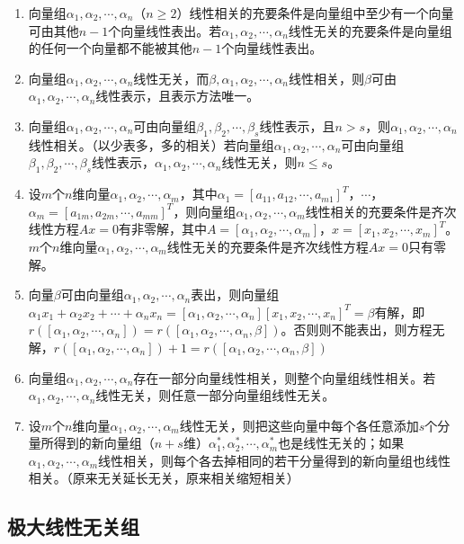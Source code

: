 \documentclass[UTF8, 12pt]{ctexart}
\begin{document}
\begin{enumerate}
\item 向量组$\alpha_1,\alpha_2,\cdots,\alpha_n$（$n\geqslant2$）线性相关的充要条件是向量组中至少有一个向量可由其他$n-1$个向量线性表出。若$\alpha_1,\alpha_2,\cdots,\alpha_n$线性无关的充要条件是向量组的任何一个向量都不能被其他$n-1$个向量线性表出。
\item 向量组$\alpha_1,\alpha_2,\cdots,\alpha_n$线性无关，而$\beta,\alpha_1,\alpha_2,\cdots,\alpha_n$线性相关，则$\beta$可由$\alpha_1,\alpha_2,\cdots,\alpha_n$线性表示，且表示方法唯一。
\item 向量组$\alpha_1,\alpha_2,\cdots,\alpha_n$可由向量组$\beta_1,\beta_2,\cdots,\beta_s$线性表示，且$n>s$，则$\alpha_1,\alpha_2,\cdots,\alpha_n$线性相关。（以少表多，多的相关）若向量组$\alpha_1,\alpha_2,\cdots,\alpha_n$可由向量组$\beta_1,\beta_2,\cdots,\beta_s$线性表示，$\alpha_1,\alpha_2,\cdots,\alpha_n$线性无关，则$n\leqslant s$。
\item 设$m$个$n$维向量$\alpha_1,\alpha_2,\cdots,\alpha_m$，其中$\alpha_1=[a_{11},a_{12},\cdots,a_{m1}]^T$，$\cdots$，$\alpha_m=[a_{1m},a_{2m},\cdots,a_{mm}]^T$，则向量组$\alpha_1,\alpha_2,\cdots,\alpha_m$线性相关的充要条件是齐次线性方程$Ax=0$有非零解，其中$A=[\alpha_1,\alpha_2,\cdots,\alpha_m]$，$x=[x_1,x_2,\cdots,x_m]^T$。$m$个$n$维向量$\alpha_1,\alpha_2,\cdots,\alpha_m$线性无关的充要条件是齐次线性方程$Ax=0$只有零解。
\item 向量$\beta$可由向量组$\alpha_1,\alpha_2,\cdots,\alpha_n$表出，则向量组$\alpha_1x_1+\alpha_2x_2+\cdots+\alpha_nx_n=[\alpha_1,\alpha_2,\cdots,\alpha_n][x_1,x_2,\cdots,x_n]^T=\beta$有解，即$r([\alpha_1,\alpha_2,\cdots,\alpha_n])=r([\alpha_1,\alpha_2,\cdots,\alpha_n,\beta])$。否则则不能表出，则方程无解，$r([\alpha_1,\alpha_2,\cdots,\alpha_n])+1=r([\alpha_1,\alpha_2,\cdots,\alpha_n,\beta])$
\item 向量组$\alpha_1,\alpha_2,\cdots,\alpha_n$存在一部分向量线性相关，则整个向量组线性相关。若$\alpha_1,\alpha_2,\cdots,\alpha_n$线性无关，则任意一部分向量组线性无关。
\item 设$m$个$n$维向量$\alpha_1,\alpha_2,\cdots,\alpha_m$线性无关，则把这些向量中每个各任意添加$s$个分量所得到的新向量组（$n+s$维）$\alpha_1^*,\alpha_2^*,\cdots,\alpha_m^*$也是线性无关的；如果$\alpha_1,\alpha_2,\cdots,\alpha_m$线性相关，则每个各去掉相同的若干分量得到的新向量组也线性相关。（原来无关延长无关，原来相关缩短相关）
\end{enumerate}

\subsection{极大线性无关组}
\end{document}
